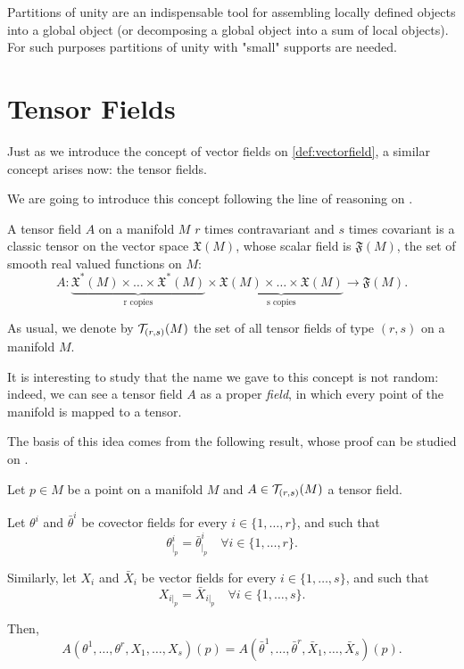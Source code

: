 Partitions of unity are an indispensable tool for assembling locally defined  objects into a global object (or decomposing a global object into a sum of local objects). For such purposes  partitions of unity with "small" supports are needed.

\section{Tensor Fields}

Just as we introduce the concept of vector fields on \autoref{def:vectorfield}, a similar concept arises now: the tensor fields.

We are going to introduce this concept following the line of reasoning on \cite[Ch. 2]{oneill83}.

\begin{definition}
	A tensor field $A$ on a manifold $M$ $r$ times contravariant and $s$ times covariant is a classic tensor on the vector space $\mathfrak{X}(M)$, whose scalar field is $\mathfrak{F}(M)$, the set of smooth real valued functions on $M$:
	\[
		A \colon \underbrace{\mathfrak{X}^*(M) \times \dots \times \mathfrak{X}^*(M)}_{\text{r copies}} \times \underbrace{\mathfrak{X}(M) \times \dots \times \mathfrak{X}(M)}_{\text{s copies}} \to \mathfrak{F}(M).
	\]
	
	As usual, we denote by ${\mathcal T}_{(r,s)}(M)$ the set of all tensor fields of type $(r,s)$ on a manifold $M$.
\end{definition}

It is interesting to study that the name we gave to this concept is not random: indeed, we can see a tensor field $A$ as a proper \emph{field}, in which every point of the manifold is mapped to a tensor.

The basis of this idea comes from the following result, whose proof can be studied on \cite[Ch. 2, Proposition 2]{oneill83}.

\begin{proposition}
	Let $p \in M$ be a point on a manifold $M$ and $A \in {\mathcal T}_{(r,s)}(M)$ a tensor field.
	
	Let $\theta^i$ and $\bar{\theta}^i$ be covector fields for every $i \in \{1, \dots, r\}$, and such that
	\[
		\theta^i_{|_p} = \bar{\theta}^i_{|_p} \quad \forall i \in \{1, \dots, r\}.
	\]
	
	Similarly, let $X_i$ and $\bar{X}_i$ be vector fields for every $i \in \{1, \dots, s\}$, and such that
	\[
		X_{i|_p} = \bar{X}_{i|_p} \quad \forall i \in \{1, \dots, s\}.
	\]
	
	Then,
	\[
		A(\theta^1, \dots, \theta^r, X_1, \dots, X_s)(p) = A(\bar{\theta}^1, \dots, \bar{\theta}^r, \bar{X}_1, \dots, \bar{X}_s)(p).
	\]
\end{proposition}

